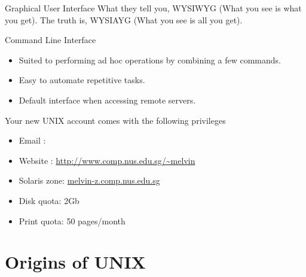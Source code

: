 \begin{frame}
\begin{block}{Graphical User Interface}
What they tell you, WYSIWYG (What you see is what you get). \pause
The truth is, WYSIAYG (What you see is all you get).
\end{block}

\pause

\begin{block}{Command Line Interface}
\begin{itemize}
\item Suited to performing ad hoc operations by combining a few commands.  
\item Easy to automate repetitive tasks.
\item Default interface when accessing remote servers.  
\end{itemize}
\end{block}
\end{frame}



\begin{frame}
Your new UNIX account comes with the following privileges
\begin{itemize}
\item Email : 
\item Website : \url{http://www.comp.nus.edu.sg/~melvin}
\item Solaris zone: \url{melvin-z.comp.nus.edu.sg}
\item Disk quota: 2Gb
\item Print quota: 50 pages/month
\end{itemize}
\end{frame}

\section{Origins of UNIX}

\begin{frame}
\end{frame}


